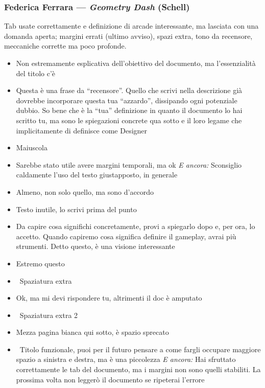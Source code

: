 \subsubsection{Federica Ferrara --- \emph{Geometry Dash} (Schell)}
Tab usate correttamente e definizione di arcade interessante, ma lasciata con
una domanda aperta; margini errati (ultimo avviso), spazi extra, tono da
recensore, meccaniche corrette ma poco profonde.
{\small
\begin{itemize}
  \item {} Non estremamente esplicativa dell'obiettivo del documento, ma l'essenzialità del titolo c'è
  \item {} Questa è una frase da ``recensore''. Quello che scrivi nella descrizione già dovrebbe incorporare questa tua ``azzardo'', dissipando ogni potenziale dubbio. So bene che è la ``tua'' definizione in quanto il documento lo hai scritto tu, ma sono le spiegazioni concrete qua sotto e il loro legame che implicitamente di definisce come Designer
  \item {} Maiuscola
  \item {} Sarebbe stato utile avere margini temporali, ma ok \emph{E ancora:} Sconsiglio caldamente l'uso del testo giustapposto, in generale
  \item {} Almeno, non solo quello, ma sono d'accordo
  \item {} Testo inutile, lo scrivi prima del punto
  \item {} Da capire cosa significhi concretamente, provi a spiegarlo dopo e, per ora, lo accetto. Quando capiremo cosa significa definire il gameplay, avrai più strumenti. Detto questo, è una visione interessante
  \item {} Estremo questo
  \item \rvVuoto\ Spaziatura extra
  \item {} Ok, ma mi devi rispondere tu, altrimenti il doc è amputato
  \item \rvVuoto\ Spaziatura extra 2
  \item {} Mezza pagina bianca qui sotto, è spazio sprecato
  \item {} \rvAvviso\ Titolo funzionale, puoi per il futuro pensare a come fargli occupare maggiore spazio a sinistra e destra, ma è una piccolezza \emph{E ancora:} Hai sfruttato correttamente le tab del documento, ma i margini non sono quelli stabiliti. La prossima volta non leggerò il documento se ripeterai l'errore

\end{itemize}}
